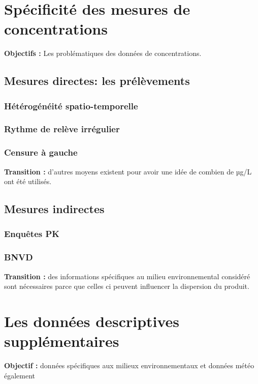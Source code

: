 \documentclass[12pt, twoside]{report}
\begin{document}
\section{Spécificité des mesures de concentrations}

\textbf{Objectifs :} Les problématiques des données de concentrations. 

\subsection{Mesures directes: les prélèvements}
\subsubsection{Hétérogénéité spatio-temporelle}
\subsubsection{Rythme de relève irrégulier}
\subsubsection{Censure à gauche}

\textbf{Transition :} d'autres moyens existent pour avoir une idée de combien de µg/L ont été utilisés. 

\subsection{Mesures indirectes}
\subsubsection{Enquêtes PK}
\subsubsection{BNVD}

\textbf{Transition :} des informations spécifiques au milieu environnemental considéré sont nécessaires parce que celles ci peuvent influencer la dispersion du produit. 

\section{Les données descriptives supplémentaires}

\textbf{Objectif :} données spécifiques aux milieux environnementaux et données météo également \\
\end{document}
